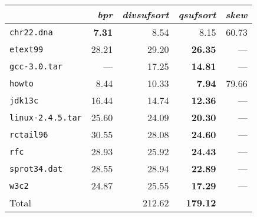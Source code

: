\begin{tabular}{l r r r r } \toprule
 & \emph{bpr} & \emph{divsufsort} & \emph{qsufsort} & \emph{skew}\\ \midrule
\texttt{chr22.dna} & \textbf{7.31} & 8.54 & 8.15 & 60.73\\
\texttt{etext99} & 28.21 & 29.20 & \textbf{26.35} & ---\\
\texttt{gcc-3.0.tar} & --- & 17.25 & \textbf{14.81} & ---\\
\texttt{howto} & 8.44 & 10.33 & \textbf{7.94} & 79.66\\
\texttt{jdk13c} & 16.44 & 14.74 & \textbf{12.36} & ---\\
\texttt{linux-2.4.5.tar} & 25.60 & 24.09 & \textbf{20.30} & ---\\
\texttt{rctail96} & 30.55 & 28.08 & \textbf{24.60} & ---\\
\texttt{rfc} & 28.93 & 25.92 & \textbf{24.43} & ---\\
\texttt{sprot34.dat} & 28.55 & 28.94 & \textbf{22.89} & ---\\
\texttt{w3c2} & 24.87 & 25.55 & \textbf{17.29} & ---\\
 \midrule
Total &  & 212.62 & \textbf{179.12} & \\
 \bottomrule
\end{tabular}
